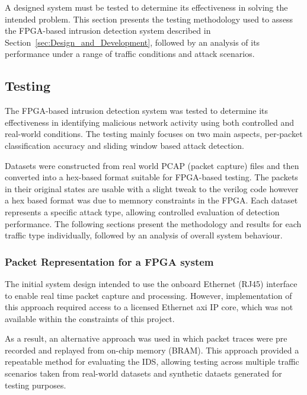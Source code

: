A designed system must be tested to determine its effectiveness in solving the intended problem. This section presents the testing methodology used to assess the FPGA-based intrusion detection system described in Section~\ref{sec:Design_and_Development}, followed by an analysis of its performance under a range of traffic conditions and attack scenarios.
\subsection{Testing}
The FPGA-based intrusion detection system was tested to determine its
effectiveness in identifying malicious network activity using both controlled
and real-world conditions. The testing mainly focuses on two main aspects,
per-packet classification accuracy and sliding window based attack detection.

Datasets were constructed from real world PCAP (packet capture) files and then
converted into a hex-based format suitable for FPGA-based testing. The packets
in their original states are usable with a slight tweak to the verilog code
however a hex based format was due to memnory constraints in the FPGA. Each
dataset represents a specific attack type, allowing controlled evaluation of
detection performance. The following sections present the methodology and
results for each traffic type individually, followed by an analysis of overall
system behaviour.

\subsubsection{Packet Representation for a FPGA system}
The initial system design intended to use the onboard Ethernet (RJ45) interface
to enable real time packet capture and processing. However, implementation of
this approach required access to a licensed Ethernet axi IP core, which was not
available within the constraints of this project.

As a result, an alternative approach was used in which packet traces were pre
recorded and replayed from on-chip memory (BRAM). This approach provided a
repeatable method for evaluating the IDS, allowing testing across multiple
traffic scenarios taken from real-world datasets and synthetic dataets
generated for testing purposes.

